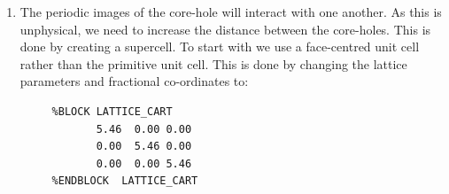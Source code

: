 \documentclass[a4paper,11pt,twoside]{book}
\begin{document}
{\begin{enumerate}
The line
\begin{verbatim}
    2|1.8|1.8|1.3|2|3|4|30:31:32LGG(qc=4)
\end{verbatim}
specifies the parameters used to create the pseudopotential.  We use this as the starting point and then remove one of the core 1s electrons to create a core-hole pseudopotential.  This is done by including \verb#{1s1.00}# in the pseudopotential string as shown:
\begin{verbatim}
    2|1.8|1.8|1.3|2|3|4|30:31:32LGG{1s1.00}(qc=4)
\end{verbatim}
If, instead of removing a 1s electron, we wanted to remove a 2s electron from the core, we would have included \verb#{2s1.00}# instead of \verb#{1s1.00}# in the pseudopotential string.

We are only interested in the spectra from the atom with the core-hole and so copy the pseudopotential file generated by the previous calculation (\verb#Si_OFT.usp#) to \verb#Si_LDA.usp#.  Then include
\begin{verbatim}
      %BLOCK SPECIES_POT
            Si:exi    2|1.8|1.8|1.3|2|3|4|30:31:32LGG{1s1.00}(qc=4)
            Si        Si_LDA.usp
      %ENDBLOCK SPECIES_POT
\end{verbatim}
in the \castep\ \verb#Si2_CORE.cell# file.


To maintain the neutrality of the cell, we include
\begin{verbatim}
  CHARGE : +1
\end{verbatim}
in the \verb#Si2_CORE.param# file.  Run the calculation.  This time the \verb#Si2_CORE_core_edge.dat# file will contain only the edges from the core-hole atom.  Compare the K-edge from the core-hole calculation with the previous non-core-hole calculation.

\item The periodic images of the core-hole will interact with one another.  As this is unphysical, we need to increase the distance between the core-holes.  This is done by creating a supercell.  To start with we use a face-centred unit cell rather than the primitive unit cell.  This is done by changing the lattice parameters and fractional co-ordinates to:
\begin{verbatim}
     %BLOCK LATTICE_CART
            5.46  0.00 0.00
            0.00  5.46 0.00
            0.00  0.00 5.46
     %ENDBLOCK  LATTICE_CART


\end{verbatim}
\end{enumerate}}
\end{document}

